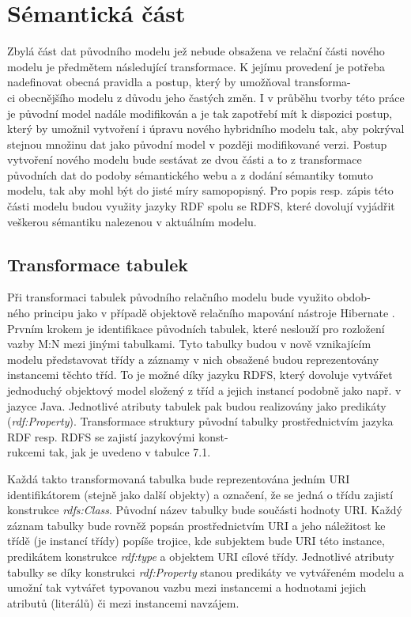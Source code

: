 \documentclass{projekt}
\begin{document}
\section{Sémantická část}
\hspace{0.65cm}Zbylá část dat původního modelu jež nebude obsažena ve relační části nového modelu je předmětem následující transformace. K jejímu provedení je potřeba nadefinovat obecná pravidla a postup, který by umožňoval transforma-\\ci obecnějšího modelu z důvodu jeho častých změn. I v průběhu tvorby této práce je původní model nadále modifikován a je tak zapotřebí mít k dispozici postup, který by umožnil vytvoření i úpravu nového hybridního modelu tak, aby pokrýval stejnou množinu dat jako původní model v později modifikované verzi. Postup vytvoření nového modelu bude sestávat ze dvou části a to z transformace původních dat do podoby sémantického webu a z dodání sémantiky tomuto modelu, tak aby mohl být do jisté míry samopopisný. 
Pro popis resp. zápis této části modelu budou využity jazyky RDF spolu se RDFS, které dovolují vyjádřit veškerou sémantiku nalezenou v aktuálním modelu.

\subsection{Transformace tabulek}
\hspace{0.65cm}Při transformaci tabulek původního relačního modelu bude využito obdob-\\ného principu jako v případě objektově relačního mapování nástroje Hibernate \cite{_29}. Prvním krokem je identifikace původních tabulek, které neslouží pro rozložení vazby M:N mezi jinými tabulkami. Tyto tabulky budou v nově vznikajícím modelu představovat třídy a záznamy v nich obsažené budou reprezentovány instancemi těchto tříd. To je možné díky jazyku RDFS, který dovoluje vytvářet jednoduchý objektový model složený z tříd a jejich instancí podobně jako např. v jazyce Java. Jednotlivé atributy tabulek pak budou realizovány jako predikáty ({\it rdf:Property}). Transformace struktury původní tabulky prostřednictvím jazyka RDF resp. RDFS se zajistí jazykovými konst-\\rukcemi tak, jak je uvedeno v tabulce 7.1.

Každá takto transformovaná tabulka bude reprezentována jedním URI identifikátorem (stejně jako další objekty) a označení, že se jedná o třídu zajistí konstrukce {\it rdfs:Class}. Původní název tabulky bude součásti hodnoty URI. Každý záznam tabulky bude rovněž popsán prostřednictvím URI a jeho náležitost ke třídě (je instancí třídy) popíše trojice, kde subjektem bude URI této instance, predikátem konstrukce {\it rdf:type} a objektem URI cílové třídy. Jednotlivé atributy tabulky se díky konstrukci {\it rdf:Property} stanou predikáty ve vytvářeném modelu a umožní tak vytvářet typovanou vazbu mezi instancemi a hodnotami jejich atributů (literálů) či mezi instancemi navzájem. 
\end{document}
